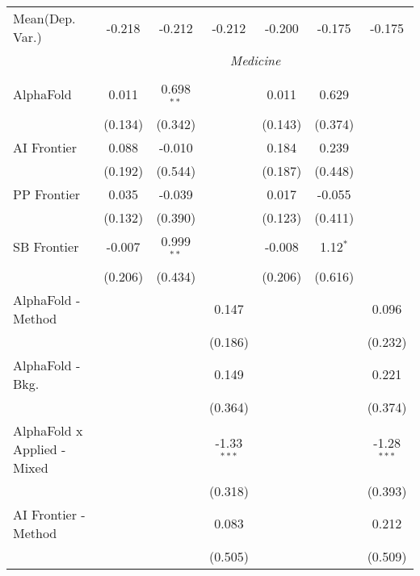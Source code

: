 \begin{tabular}{lcccccc}
Mean(Dep. Var.) & -0.218 & -0.212 & -0.212 & -0.200 & -0.175 & -0.175 \\
 & \multicolumn{6}{c}{\textit{Medicine}} \\ \\
   AlphaFold                   & 0.011   & 0.698$^{**}$ &               & 0.011   & 0.629      &   \\   
                               & (0.134) & (0.342)      &               & (0.143) & (0.374)    &   \\   
   AI Frontier                 & 0.088   & -0.010       &               & 0.184   & 0.239      &   \\   
                               & (0.192) & (0.544)      &               & (0.187) & (0.448)    &   \\   
   PP Frontier                 & 0.035   & -0.039       &               & 0.017   & -0.055     &   \\   
                               & (0.132) & (0.390)      &               & (0.123) & (0.411)    &   \\   
   SB Frontier                 & -0.007  & 0.999$^{**}$ &               & -0.008  & 1.12$^{*}$ &   \\   
                               & (0.206) & (0.434)      &               & (0.206) & (0.616)    &   \\   
   AlphaFold - Method          &         &              & 0.147         &         &            & 0.096\\   
                               &         &              & (0.186)       &         &            & (0.232)\\   
   AlphaFold - Bkg.            &         &              & 0.149         &         &            & 0.221\\   
                               &         &              & (0.364)       &         &            & (0.374)\\   
   AlphaFold x Applied - Mixed &         &              & -1.33$^{***}$ &         &            & -1.28$^{***}$\\   
                               &         &              & (0.318)       &         &            & (0.393)\\   
   AI Frontier - Method        &         &              & 0.083         &         &            & 0.212\\   
                               &         &              & (0.505)       &         &            & (0.509)\\   

\end{tabular}
